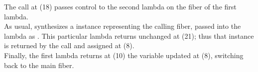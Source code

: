 
The  call at (18) passes control to the second
lambda on the fiber of the first lambda.\\

As usual, \resumewith synthesizes a \fiber instance representing the calling
fiber, passed into the lambda as . This particular lambda returns 
unchanged at (21); thus that  instance is returned by the \resume call
and assigned at (8).\\

Finally, the first lambda returns at (10) the  variable updated at (8),
switching back to the main fiber.\\

